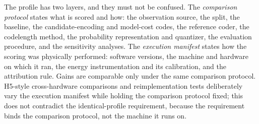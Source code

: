 \documentclass[11pt]{article}
\begin{document}
The profile has two layers, and they must not be confused. The \textit{comparison protocol} states what is scored and how: the observation source, the split, the baseline, the candidate-encoding and model-cost codes, the reference coder, the codelength method, the probability representation and quantizer, the evaluation procedure, and the sensitivity analyses. The \textit{execution manifest} states how the scoring was physically performed: software versions, the machine and hardware on which it ran, the energy instrumentation and its calibration, and the attribution rule. Gains are comparable only under the same comparison protocol. H5-style cross-hardware comparisons and reimplementation tests deliberately vary the execution manifest while holding the comparison protocol fixed; this does not contradict the identical-profile requirement, because the requirement binds the comparison protocol, not the machine it runs on.
\end{document}
